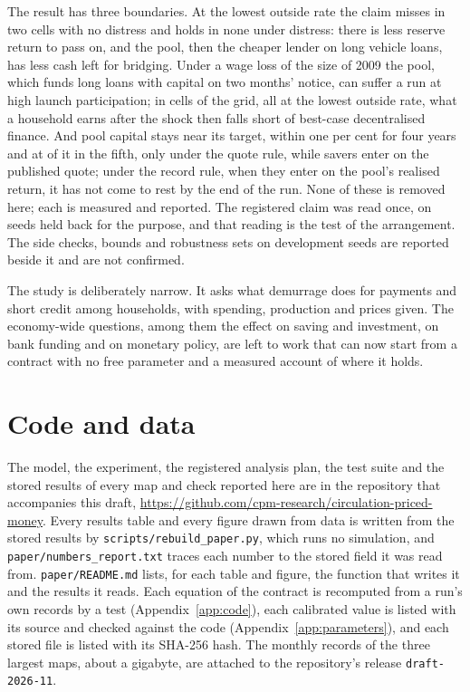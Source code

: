 \documentclass[10pt,a4paper]{article}
\theoremstyle{remark}
\let\savedsection\section
\renewcommand{\section}{\FloatBarrier\savedsection}
\begin{document}
The result has three boundaries. At the lowest outside rate the claim misses
in two cells with no distress and holds in none under distress: there is less
reserve return to pass on, and the pool, then the cheaper lender on long
vehicle loans, has less cash left for bridging. Under a wage loss of the
size of 2009 the pool, which funds long loans with capital on two months'
notice, can suffer a run at high launch participation; in
\GainAfterDefiBehind{} cells of
the grid, all at the lowest outside rate, what a household earns after the
shock then falls short of best-case decentralised finance. And pool capital
stays near its target, within one per cent for four years and at
\PathFirstRatioFive{} of it in the fifth, only under the quote rule, while savers enter on the
published quote; under the record rule, when they enter on the pool's realised
return, it has not come to rest by the end of the run. None
of these is
removed here; each is measured and reported. The registered claim was read
once, on \SeedsConfirm{} seeds held back for the purpose, and that reading is
the test of the arrangement. The side checks, bounds and robustness sets on
development seeds are reported beside it and are not confirmed.

The study is deliberately narrow. It asks what demurrage does for payments
and short credit among households, with spending, production and prices
given. The economy-wide questions, among them the effect on saving
and investment, on bank funding and on monetary policy, are left to
work that can now start from a contract with no free parameter and a
measured account of where it holds.

\section*{Code and data}
The model, the experiment, the registered analysis plan, the test suite and
the stored results of every map and check reported here are in the repository
that accompanies this draft, \url{https://github.com/cpm-research/circulation-priced-money}. Every results table and every figure drawn from
data is written from the stored results by \texttt{scripts/rebuild\_paper.py},
which runs no simulation, and \texttt{paper/numbers\_report.txt} traces each
number to the stored field it was read from. \texttt{paper/README.md} lists,
for each table and figure, the function that writes it and the results it
reads. Each equation of the contract is recomputed from a run's own records by
a test (Appendix~\ref{app:code}), each calibrated value is listed with its
source and checked against the code (Appendix~\ref{app:parameters}), and each
stored file is listed with its SHA-256 hash. The monthly records of the three
largest maps, about a gigabyte, are attached to the repository's release
\texttt{draft-2026-11}.
\end{document}
